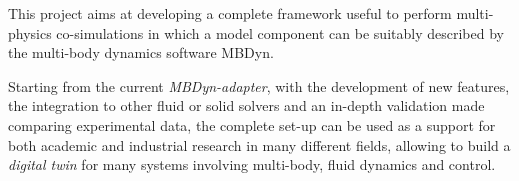 This project aims at developing a complete framework useful to perform multi-physics co-simulations in which a model component can be suitably described by the multi-body dynamics software MBDyn.  

Starting from the current \textit{MBDyn-adapter}, with the development of new features, the integration to other fluid or solid solvers and an in-depth validation made comparing experimental data, the complete set-up can be used as a support for both academic and industrial research in many different fields, allowing to build a \textit{digital twin} for many systems involving multi-body, fluid dynamics and control.